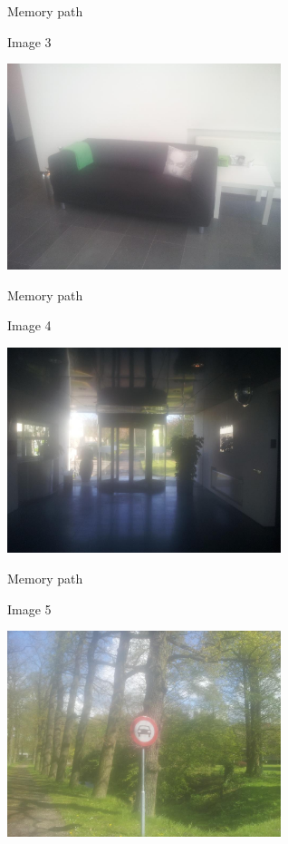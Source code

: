 \begin{frame}{Memory path}
  \begin{block}{Image 3}
    \begin{center}
      \includegraphics[height=6cm]{img/loci/03.jpg}
    \end{center}
  \end{block}
\end{frame}

\begin{frame}{Memory path}
  \begin{block}{Image 4}
    \begin{center}
      \includegraphics[height=6cm]{img/loci/04.jpg}
    \end{center}
  \end{block}
\end{frame}

\begin{frame}{Memory path}
  \begin{block}{Image 5}
    \begin{center}
      \includegraphics[height=6cm]{img/loci/05.jpg}
    \end{center}
  \end{block}
\end{frame}

